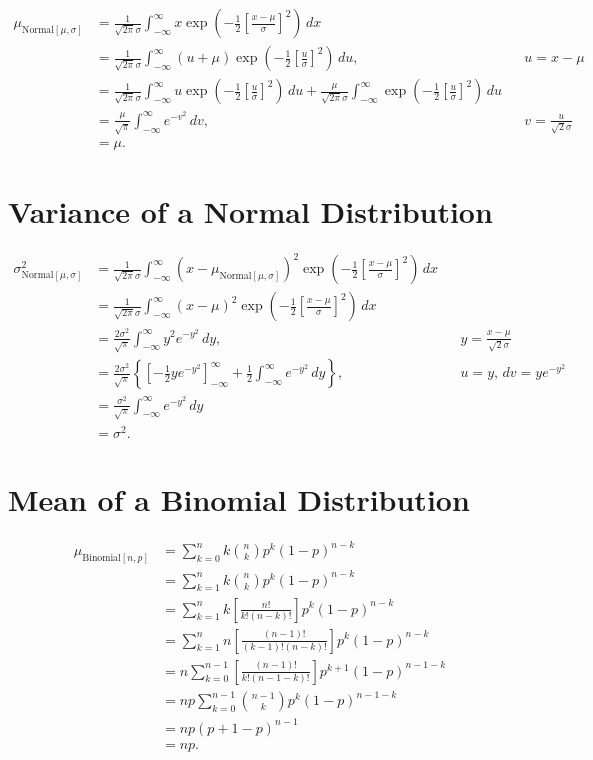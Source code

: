 \documentclass{myart}
\newcommand{\intr}{\int_{-\infty}^\infty}
\newcommand{\du}{\,du}
\newcommand{\dv}{\,dv}
\newcommand{\dx}{\,dx}
\newcommand{\dy}{\,dy}
\newcommand{\mean}{\mu}
\newcommand{\sdev}{\sigma}
\newcommand{\variance}{\sigma^2}
\newcommand{\sub}[1]{_{\text{#1}}}
\begin{document}
\begin{align*}
\mean\sub{Normal$[\mean,\sdev]$} &= \frac{1}{\sqrt{2\pi} \sdev} \intr x \exp\left(-\frac{1}{2} \left[\frac{x - \mean}{\sdev}\right]^2\right) \dx \\
&= \frac{1}{\sqrt{2\pi} \sdev} \intr (u + \mean) \exp\left(-\frac{1}{2} \left[\frac{u}{\sdev}\right]^2\right) \du, && u = x - \mean \\
&= \frac{1}{\sqrt{2\pi} \sdev} \intr u \exp\left(-\frac{1}{2} \left[\frac{u}{\sdev}\right]^2\right) \du + \frac{\mean}{\sqrt{2\pi} \sdev} \intr \exp\left(-\frac{1}{2} \left[\frac{u}{\sdev}\right]^2\right) \du \\
&= \frac{\mean}{\sqrt{\pi}} \intr e^{-v^2} \dv, && v = \frac{u}{\sqrt{2} \sdev} \\
&= \mu.
\end{align*}

\section{Variance of a Normal Distribution}

\begin{align*}
\variance\sub{Normal$[\mean,\sdev]$} &= \frac{1}{\sqrt{2\pi} \sdev} \intr (x - \mean\sub{Normal$[\mean,\sdev]$})^2 \exp\left(-\frac{1}{2} \left[\frac{x - \mean}{\sdev}\right]^2\right) \dx \\
&= \frac{1}{\sqrt{2\pi} \sdev} \intr (x - \mean)^2 \exp\left(-\frac{1}{2} \left[\frac{x - \mean}{\sdev}\right]^2\right) \dx \\
&= \frac{2\variance}{\sqrt{\pi}} \intr y^2 e^{-y^2} \dy, && y = \frac{x - \mean}{\sqrt{2} \sdev} \\
&= \frac{2\variance}{\sqrt{\pi}} \left\{\left[-\frac{1}{2} y e^{-y^2}\right]_{-\infty}^\infty + \frac{1}{2} \intr e^{-y^2} \dy\right\}, && u = y, \dv = y e^{-y^2} \\
&= \frac{\variance}{\sqrt{\pi}} \intr e^{-y^2} \dy \\
&= \variance.
\end{align*}

\section{Mean of a Binomial Distribution}

\begin{align*}
\mean\sub{Binomial$[n,p]$} &= \sum_{k=0}^n k \binom{n}{k} p^k (1-p)^{n-k} \\
&= \sum_{k=1}^n k \binom{n}{k} p^k (1-p)^{n-k} \\
&= \sum_{k=1}^n k \left[\frac{n!}{k!(n-k)!}\right] p^k (1-p)^{n-k} \\
&= \sum_{k=1}^n n \left[\frac{(n-1)!}{(k-1)!(n-k)!}\right] p^k (1-p)^{n-k} \\
&= n \sum_{k=0}^{n-1} \left[\frac{(n-1)!}{k!(n-1-k)!}\right] p^{k+1} (1-p)^{n-1-k} \\
&= n p \sum_{k=0}^{n-1} \binom{n-1}{k} p^k (1-p)^{n-1-k} \\
&= n p (p + 1 - p)^{n-1} \\
&= n p.
\end{align*}
\end{document}
